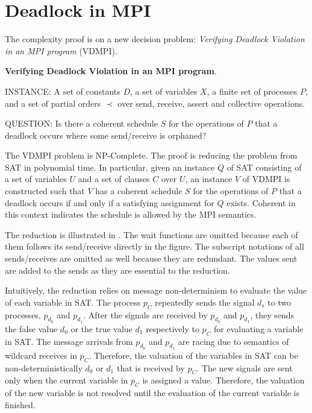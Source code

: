 ﻿\section{Deadlock in MPI}
The complexity proof is on a
new decision problem: \emph{Verifying Deadlock Violation in an MPI program}
(VDMPI).
\begin{definition}
\textbf{Verifying Deadlock Violation in an MPI program}.
\begin{compactdesc}
\item{INSTANCE}: A set of constants $D$, a set of variables $X$, a finite set of processes $P$, and a
  set of partial orders $\prec$ over send, receive, assert and
  collective operations.
\item{QUESTION}: Is there a coherent schedule $S$ for the operations of $P$ that a deadlock occurs where some send/receive
is orphaned?
\end{compactdesc}
\label{def:np1}
\end{definition}

The VDMPI problem is NP-Complete. The proof is reducing the problem from SAT in polynomial time. In particular, given an instance $Q$ of SAT consisting of a set of variables $U$ and a set of clauses $C$ over $U$, an instance $V$ of VDMPI is constructed such that $V$ has a coherent schedule $S$ for the operations of $P$ that a deadlock occurs if and only if a satisfying assignment for $Q$ exists. Coherent in this context indicates the schedule is allowed by the MPI semantics.

The reduction is illustrated in . The wait functions are omitted because each of them follows its send/receive directly in the figure. The subscript notations of all sends/receives are omitted as well because they are redundant. The values sent are added to the sends as they are essential to the reduction. 

Intuitively, the reduction relies on message non-determinism to evaluate the value of each variable in SAT. The process $\mathit{p_C}$ repeatedly sends the signal $d_s$ to two processes, $\mathit{p_{d_0}}$ and $\mathit{p_{d_1}}$. After the signals are received by $\mathit{p_{d_0}}$ and $\mathit{p_{d_1}}$, they sends the false value $\mathit{d_0}$ or the true value $\mathit{d_1}$ respectively to $\mathit{p_{C}}$ for evaluating a variable in SAT. The message arrivals from $\mathit{p_{d_0}}$ and $\mathit{p_{d_1}}$ are racing due to semantics of wildcard receives in $\mathit{p_C}$. Therefore, the valuation of the variables in SAT can be non-deterministically $\mathit{d_0}$ or $\mathit{d_1}$ that is received by $\mathit{p_C}$. The new signals are sent only when the current variable in $\mathit{p_C}$ is assigned a value. Therefore, the valuation of the new variable is not resolved until the evaluation of the current variable is finished.

